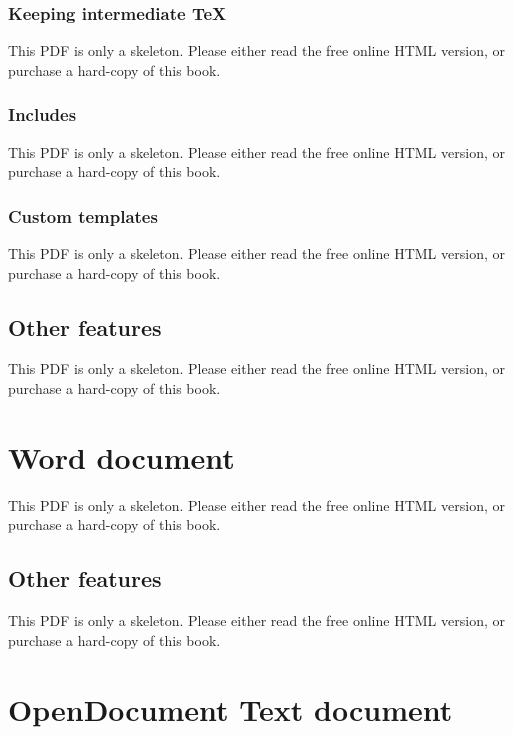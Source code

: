 \documentclass[
  11pt,
]{krantz}
\theoremstyle{definition}
\theoremstyle{definition}
\theoremstyle{definition}
\theoremstyle{definition}
\theoremstyle{remark}
\begin{document}
\subsubsection{Keeping intermediate TeX}\label{keeping-intermediate-tex}

This PDF is only a skeleton. Please either read the free online HTML version, or purchase a hard-copy of this book.

\subsubsection{Includes}\label{includes-1}

This PDF is only a skeleton. Please either read the free online HTML version, or purchase a hard-copy of this book.

\subsubsection{Custom templates}\label{custom-templates-1}

This PDF is only a skeleton. Please either read the free online HTML version, or purchase a hard-copy of this book.

\subsection{Other features}\label{other-features}

This PDF is only a skeleton. Please either read the free online HTML version, or purchase a hard-copy of this book.

\section{Word document}\label{word-document}

This PDF is only a skeleton. Please either read the free online HTML version, or purchase a hard-copy of this book.

\subsection{Other features}\label{other-features-1}

This PDF is only a skeleton. Please either read the free online HTML version, or purchase a hard-copy of this book.

\section{OpenDocument Text document}\label{opendocument-text-document}
\end{document}
